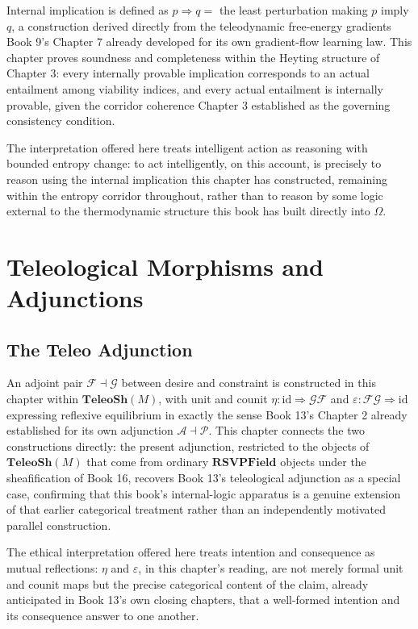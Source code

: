 Internal implication is defined as $p \Rightarrow q = $ the least perturbation making $p$ imply $q$, a construction derived directly from the teleodynamic free-energy gradients Book 9's Chapter 7 already developed for its own gradient-flow learning law. This chapter proves soundness and completeness within the Heyting structure of Chapter 3: every internally provable implication corresponds to an actual entailment among viability indices, and every actual entailment is internally provable, given the corridor coherence Chapter 3 established as the governing consistency condition.

The interpretation offered here treats intelligent action as reasoning with bounded entropy change: to act intelligently, on this account, is precisely to reason using the internal implication this chapter has constructed, remaining within the entropy corridor throughout, rather than to reason by some logic external to the thermodynamic structure this book has built directly into $\Omega$.

\part{Teleological Morphisms and Adjunctions}

\chapter{The Teleo Adjunction}

An adjoint pair $\mathcal{F} \dashv \mathcal{G}$ between desire and constraint is constructed in this chapter within $\mathbf{TeleoSh}(M)$, with unit and counit $\eta: \mathrm{id} \Rightarrow \mathcal{G}\mathcal{F}$ and $\varepsilon: \mathcal{F}\mathcal{G} \Rightarrow \mathrm{id}$ expressing reflexive equilibrium in exactly the sense Book 13's Chapter 2 already established for its own adjunction $\mathcal{A} \dashv \mathcal{P}$. This chapter connects the two constructions directly: the present adjunction, restricted to the objects of $\mathbf{TeleoSh}(M)$ that come from ordinary $\mathbf{RSVPField}$ objects under the sheafification of Book 16, recovers Book 13's teleological adjunction as a special case, confirming that this book's internal-logic apparatus is a genuine extension of that earlier categorical treatment rather than an independently motivated parallel construction.

The ethical interpretation offered here treats intention and consequence as mutual reflections: $\eta$ and $\varepsilon$, in this chapter's reading, are not merely formal unit and counit maps but the precise categorical content of the claim, already anticipated in Book 13's own closing chapters, that a well-formed intention and its consequence answer to one another.

